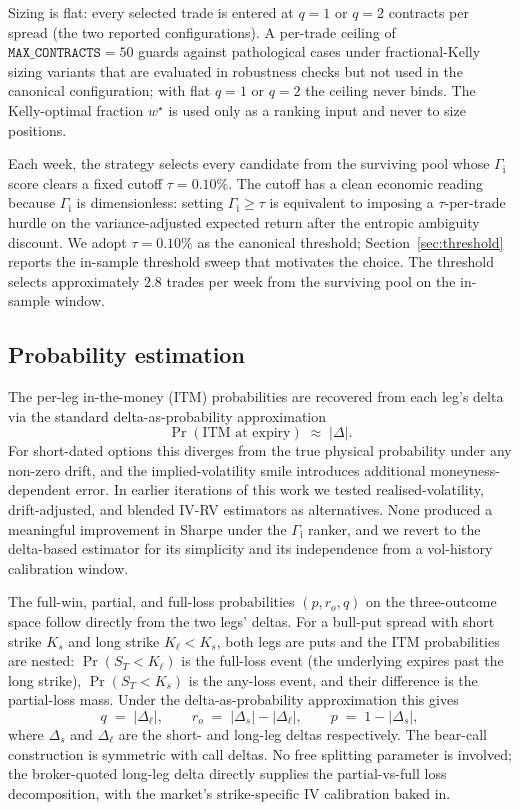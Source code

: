 \documentclass[11pt]{article}
\theoremstyle{definition}
\theoremstyle{remark}
\newcommand{\GROUND}{\Gamma_{\mathrm{i}}}
\begin{document}
Sizing is flat: every selected trade is entered at $q = 1$ or
$q = 2$ contracts per spread (the two reported configurations).
A per-trade ceiling of $\texttt{MAX\_CONTRACTS} = 50$ guards
against pathological cases under fractional-Kelly sizing variants
that are evaluated in robustness checks but not used in the
canonical configuration; with flat $q = 1$ or $q = 2$ the ceiling
never binds. The Kelly-optimal fraction $w^\star$ is used only as
a ranking input and never to size positions.

Each week, the strategy selects every candidate from the surviving
pool whose $\GROUND$ score clears a fixed cutoff
$\tau = 0.10\%$. The cutoff has a clean economic reading because
$\GROUND$ is dimensionless: setting $\GROUND \geq \tau$ is
equivalent to imposing a $\tau$-per-trade hurdle on the
variance-adjusted expected return after the entropic ambiguity
discount. We adopt $\tau = 0.10\%$ as the canonical threshold;
Section~\ref{sec:threshold} reports the in-sample threshold sweep
that motivates the choice. The threshold selects approximately
$2.8$ trades per week from the surviving pool on the in-sample
window.

\subsection{Probability estimation}

The per-leg in-the-money (ITM) probabilities are recovered from
each leg's delta via the standard delta-as-probability
approximation
\begin{equation*}
\Pr(\text{ITM at expiry}) \;\approx\; |\Delta|.
\end{equation*}
For short-dated options this diverges from the true physical
probability under any non-zero drift, and the implied-volatility
smile introduces additional moneyness-dependent error. In earlier
iterations of this work we tested realised-volatility,
drift-adjusted, and blended IV-RV estimators as alternatives.
None produced a meaningful improvement in Sharpe under the
$\GROUND$ ranker, and we revert to the delta-based estimator for
its simplicity and its independence from a vol-history
calibration window.

The full-win, partial, and full-loss probabilities
$(p, r_o, q)$ on the three-outcome space follow directly from the
two legs' deltas. For a bull-put spread with short strike
$K_s$ and long strike $K_\ell < K_s$, both legs are puts and the
ITM probabilities are nested: $\Pr(S_T < K_\ell)$ is the
full-loss event (the underlying expires past the long strike),
$\Pr(S_T < K_s)$ is the any-loss event, and their difference is
the partial-loss mass. Under the delta-as-probability
approximation this gives
\begin{equation*}
q \;=\; |\Delta_\ell|, \qquad
r_o \;=\; |\Delta_s| - |\Delta_\ell|, \qquad
p \;=\; 1 - |\Delta_s|,
\end{equation*}
where $\Delta_s$ and $\Delta_\ell$ are the short- and long-leg
deltas respectively. The bear-call construction is symmetric
with call deltas. No free splitting parameter is involved; the
broker-quoted long-leg delta directly supplies the partial-vs-full
loss decomposition, with the market's strike-specific IV
calibration baked in.
\end{document}
